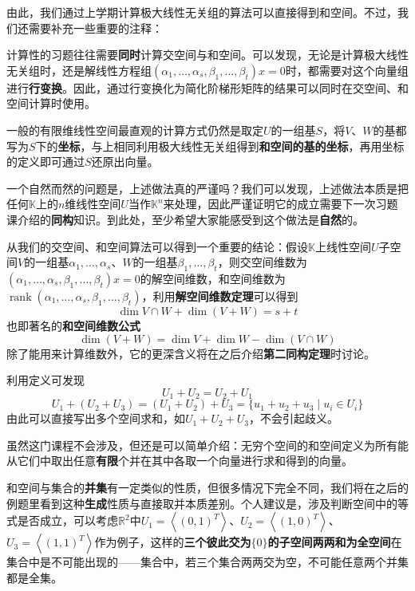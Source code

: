 \documentclass[a4paper,UTF8,fontset=windows,AutoFakeBold]{ctexart}
\DeclareMathOperator{\rank}{rank}
\begin{document}
由此，我们通过上学期计算极大线性无关组的算法可以直接得到和空间。不过，我们还需要补充一些重要的注释：
\begin{compactitem}
    \item 计算性的习题往往需要\textbf{同时}计算交空间与和空间。可以发现，无论是计算极大线性无关组时，还是解线性方程组$(\alpha_1,\dots,\alpha_s,\beta_1,\dots,\beta_t)x=0$时，都需要对这个向量组进行\textbf{行变换}。因此，通过行变换化为简化阶梯形矩阵的结果可以同时在交空间、和空间计算时使用。

    \item 一般的有限维线性空间最直观的计算方式仍然是取定$U$的一组基$S$，将$V$、$W$的基都写为$S$下的\textbf{坐标}，与上相同利用极大线性无关组得到\textbf{和空间的基的坐标}，再用坐标的定义即可通过$S$还原出向量。
    
    \item 一个自然而然的问题是，上述做法真的严谨吗？我们可以发现，上述做法本质是把任何$\mathbb{K}$上的$n$维线性空间$U$当作$\mathbb{K}^n$来处理，因此严谨证明它的成立需要下一次习题课介绍的\textbf{同构}知识。到此处，至少希望大家能感受到这个做法是\textbf{自然}的。
    
    \item 从我们的交空间、和空间算法可以得到一个重要的结论：假设$\mathbb{K}$上线性空间$U$子空间$V$的一组基$\alpha_1,\dots,\alpha_s$、$W$的一组基$\beta_1,\dots,\beta_t$，则交空间维数为$(\alpha_1,\dots,\alpha_s,\beta_1,\dots,\beta_t)x=0$的解空间维数，和空间维数为$\rank(\alpha_1,\dots,\alpha_s,\beta_1,\dots,\beta_t)$，利用\textbf{解空间维数定理}可以得到
    $$\dim V\cap W+\dim(V+W)=s+t$$
    也即著名的\textbf{和空间维数公式}
    $$\dim(V+W)=\dim V+\dim W-\dim(V\cap W)$$
    除了能用来计算维数外，它的更深含义将在之后介绍\textbf{第二同构定理}时讨论。
    \item 利用定义可发现
    $$U_1+U_2=U_2+U_1$$
    $$U_1+(U_2+U_3)=(U_1+U_2)+U_3=\{u_1+u_2+u_3\mid u_i\in U_i\}$$
    由此可以直接写出多个空间求和，如$U_1+U_2+U_3$，不会引起歧义。
    \item 虽然这门课程不会涉及，但还是可以简单介绍：无穷个空间的和空间定义为所有能从它们中取出任意\textbf{有限}个并在其中各取一个向量进行求和得到的向量。
\end{compactitem}

和空间与集合的\textbf{并集}有一定类似的性质，但很多情况下完全不同，我们将在之后的例题里看到这种\textbf{生成}性质与直接取并本质差别。个人建议是，涉及判断空间中的等式是否成立，可以考虑$\mathbb{R}^2$中$U_1=\left<(0,1)^T\right>$、$U_2=\left<(1,0)^T\right>$、$U_3=\left<(1,1)^T\right>$作为例子，这样的\textbf{三个彼此交为$\{0\}$的子空间两两和为全空间}在集合中是不可能出现的——集合中，若三个集合两两交为空，不可能任意两个并集都是全集。
\end{document}
